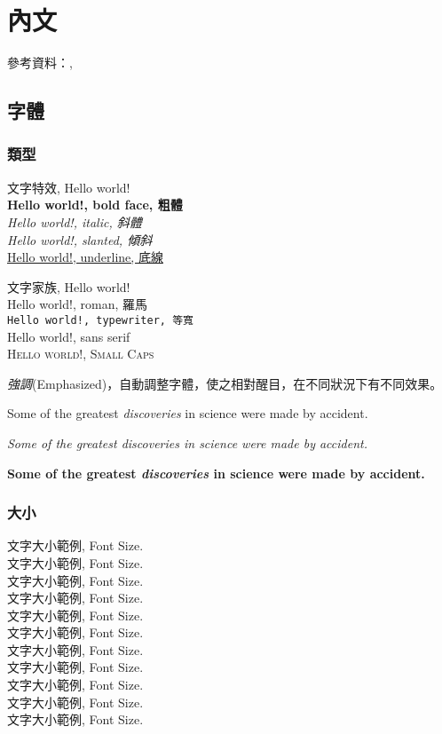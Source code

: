\chapter{內文} \label{ch_content}
參考資料：\cite{latex_basic}, \cite{latex_fbox}
\section{字體}
\subsection{類型}
文字特效, Hello world!      \\
{\LARGE
\textbf{Hello world!, bold face, 粗體} \\
\textit{Hello world!, italic, 斜體} \\
\textsl{Hello world!, slanted, 傾斜} \\
\underline{Hello world!, underline, 底線} \\
}

文字家族, Hello world!      \\
{\LARGE
\textrm{Hello world!, roman, 羅馬} \\
\texttt{Hello world!, typewriter, 等寬} \\
\textsf{Hello world!, sans serif} \\
\textsc{Hello world!, Small Caps} \\
}

\emph{強調}(Emphasized)，自動調整字體，使之相對醒目，在不同狀況下有不同效果。

Some of the greatest \emph{discoveries} 
in science 
were made by accident.

\textit{Some of the greatest \emph{discoveries} 
in science 
were made by accident.}

\textbf{Some of the greatest \emph{discoveries} 
in science 
were made by accident.}

\subsection{大小}
文字大小範例, Font Size.\\
{\tiny 文字大小範例, Font Size.}\\
{\scriptsize 文字大小範例, Font Size.}\\
{\footnotesize 文字大小範例, Font Size.}\\
{\small 文字大小範例, Font Size.}\\
{\normalsize 文字大小範例, Font Size.}\\
{\large 文字大小範例, Font Size.}\\
{\Large 文字大小範例, Font Size.}\\
{\LARGE 文字大小範例, Font Size.}\\
{\huge 文字大小範例, Font Size.} \\
{\Huge 文字大小範例, Font Size.}


